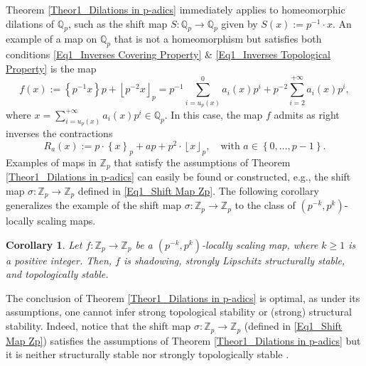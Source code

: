 \documentclass[a4paper, 12pt]{article}
\newtheorem{corollary}[theorem]{Corollary}
\theoremstyle{definition}
\begin{document}
	
	
	Theorem \ref{Theor1_Dilations in p-adics} immediately applies to homeomorphic dilations of $\mathbb{Q}_{p}$, such as the shift map $S: \mathbb{Q}_{p} \to \mathbb{Q}_{p}$ given by $ S(x) :=   p^{-1} \cdot x $. 
	An example of a map on $\mathbb{Q}_{p}$ that is not a homeomorphism but satisfies both conditions \eqref{Eq1_Inverses Covering Property} \& \eqref{Eq1_Inverses Topological Property} is the map 
	$$ f \left(  x  \right)  :=     \left\{  p^{-1} x  \right\}{p}  +  \left\lfloor  p^{-2}  x   \right\rfloor_{p}    =   p^{-1} \sum_{i = u_{p} \left(  x  \right)  }^{0} a_{i} \left(  x  \right)  p^{i} + p^{-2} \sum_{i=2}^{+ \infty } a_{i} \left(  x  \right)  p^{i},   $$
	where $x  = \sum_{i = u_{p} \left(  x  \right) }^{+ \infty } a_{i} \left(  x  \right)  p^{i} \in \mathbb{Q}_{p}$. 
	In this case, the map $f$ admits as right inverses the contractions 
	\begin{equation}\label{Eq1_rho-open Contractions}
		R_{a} \left(  x  \right)  := p \cdot  \left\{  x  \right\}_{p} + ap + p^{2}\cdot  \left\lfloor  x   \right\rfloor_{p} , \quad \text{with } a \in  \left\{  0, \dots, p-1  \right\}  .
	\end{equation} 
	Examples of maps in $\mathbb{Z}_{p}$ that satisfy the assumptions of Theorem \ref{Theor1_Dilations in p-adics} can easily be found or constructed, e.g., the shift map $\sigma: \mathbb{Z}_{p} \to \mathbb{Z}_{p}$ defined in \eqref{Eq1_Shift Map Zp}. The following corollary generalizes the example of the shift map $\sigma : \mathbb{Z}_{p} \to \mathbb{Z}_{p}$ to the class of $ \left(  p^{-k}, p^{k}  \right) $-locally scaling maps. 
	
	\begin{corollary}\label{Cor1_Locally Scaling Maps}
		Let $f: \mathbb{Z}_{p} \to \mathbb{Z}_{p}$ be a $ \left(  p^{-k}, p^{k}  \right) $-locally scaling map, where $k\ge 1$ is a positive integer. Then, $f$ is shadowing, strongly Lipschitz structurally stable, and topologically stable.
		
	\end{corollary}
	
	
	The conclusion of Theorem \ref{Theor1_Dilations in p-adics} is optimal, as under its assumptions, one cannot infer strong topological stability or (strong) structural stability. Indeed, notice that the shift map $ \sigma : \mathbb{Z}_{p} \to \mathbb{Z}_{p}$ (defined in \eqref{Eq1_Shift Map Zp}) satisfies the assumptions of Theorem \ref{Theor1_Dilations in p-adics} but it is neither structurally stable nor strongly topologically stable \cite{Bastos-Caprio-Messaudi_Shadowing_and_Stability_in_p-adic_Dynamics}.  
	
\end{document}
